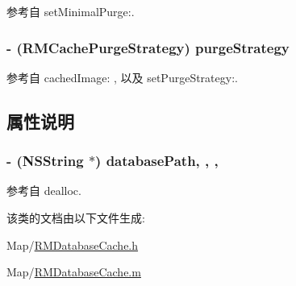 参考自 set\-Minimal\-Purge\-:.

\hypertarget{interface_r_m_database_cache_a9504fb13d6065ee7a3cd5b37f500921d}{
\subsubsection[{purge\-Strategy}]{\setlength{\rightskip}{0pt plus 5cm}-\/ ({\bf R\-M\-Cache\-Purge\-Strategy}) purge\-Strategy\hspace{0.3cm}{\ttfamily [protected]}}}\label{interface_r_m_database_cache_a9504fb13d6065ee7a3cd5b37f500921d}


参考自 cached\-Image\-: , 以及 set\-Purge\-Strategy\-:.



\subsection{属性说明}
\hypertarget{interface_r_m_database_cache_a7c19186ec63b382cae1348a92b266ee7}{
\subsubsection[{database\-Path}]{\setlength{\rightskip}{0pt plus 5cm}-\/ (N\-S\-String $\ast$) database\-Path\hspace{0.3cm}{\ttfamily [read]}, {\ttfamily [write]}, {\ttfamily [atomic]}, {\ttfamily [retain]}}}\label{interface_r_m_database_cache_a7c19186ec63b382cae1348a92b266ee7}


参考自 dealloc.



该类的文档由以下文件生成\-:\begin{DoxyCompactItemize}
\item 
Map/\hyperlink{_r_m_database_cache_8h}{R\-M\-Database\-Cache.\-h}\item 
Map/\hyperlink{_r_m_database_cache_8m}{R\-M\-Database\-Cache.\-m}\end{DoxyCompactItemize}
